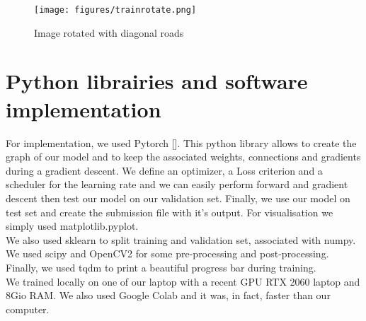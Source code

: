 \documentclass[10pt,conference,compsocconf]{IEEEtran}
\begin{document}
\FloatBarrier
\begin{figure}[ht] \centering
    \texttt{[image: figures/trainrotate.png]}
    \caption{Image rotated with diagonal roads}
    \label{fig:trainrotate}
\end{figure}
\FloatBarrier

\section{Python librairies and software implementation}
For implementation, we used Pytorch [\cite{pytorch}]. This python library allows to create the graph of our model and to keep the associated weights, connections and gradients during a gradient descent. We define an optimizer, a Loss criterion and a scheduler for the learning rate and we can easily perform forward and gradient descent then test our model on our validation set. Finally, we use our model on test set and create the submission file with it's output.
For visualisation we simply used matplotlib.pyplot. \\
We also used sklearn to split training and validation set, associated with numpy. We used scipy and OpenCV2 for some pre-processing and post-processing. Finally, we used tqdm to print a beautiful progress bar during training. \\
We trained locally on one of our laptop with a recent GPU RTX 2060 laptop and 8Gio RAM. We also used Google Colab and it was, in fact, faster than our computer.
\end{document}
